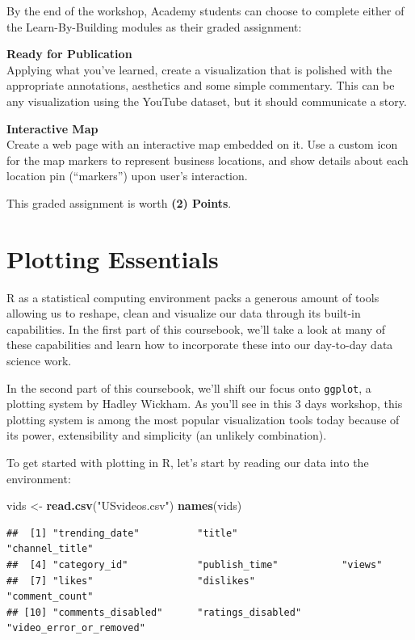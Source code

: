 \documentclass[]{article}
\newenvironment{Shaded}{\begin{snugshade}}{\end{snugshade}}
\newcommand{\KeywordTok}[1]{\textcolor[rgb]{0.13,0.29,0.53}{\textbf{#1}}}
\newcommand{\NormalTok}[1]{#1}
\newcommand{\StringTok}[1]{\textcolor[rgb]{0.31,0.60,0.02}{#1}}
\begin{document}
By the end of the workshop, Academy students can choose to complete
either of the Learn-By-Building modules as their graded assignment:

\textbf{Ready for Publication}\\
Applying what you've learned, create a visualization that is polished
with the appropriate annotations, aesthetics and some simple commentary.
This can be any visualization using the YouTube dataset, but it should
communicate a story.

\textbf{Interactive Map}\\
Create a web page with an interactive map embedded on it. Use a custom
icon for the map markers to represent business locations, and show
details about each location pin (``markers'') upon user's interaction.

This graded assignment is worth \textbf{(2) Points}.

\hypertarget{plotting-essentials}{%
\section{Plotting Essentials}\label{plotting-essentials}}

R as a statistical computing environment packs a generous amount of
tools allowing us to reshape, clean and visualize our data through its
built-in capabilities. In the first part of this coursebook, we'll take
a look at many of these capabilities and learn how to incorporate these
into our day-to-day data science work.

In the second part of this coursebook, we'll shift our focus onto
\texttt{ggplot}, a plotting system by Hadley Wickham. As you'll see in
this 3 days workshop, this plotting system is among the most popular
visualization tools today because of its power, extensibility and
simplicity (an unlikely combination).

To get started with plotting in R, let's start by reading our data into
the environment:

\begin{Shaded}
\begin{Highlighting}[]
\NormalTok{vids <-}\StringTok{ }\KeywordTok{read.csv}\NormalTok{(}\StringTok{"USvideos.csv"}\NormalTok{)}
\KeywordTok{names}\NormalTok{(vids)}
\end{Highlighting}
\end{Shaded}

\begin{verbatim}
##  [1] "trending_date"          "title"                  "channel_title"         
##  [4] "category_id"            "publish_time"           "views"                 
##  [7] "likes"                  "dislikes"               "comment_count"         
## [10] "comments_disabled"      "ratings_disabled"       "video_error_or_removed"
\end{verbatim}
\end{document}
